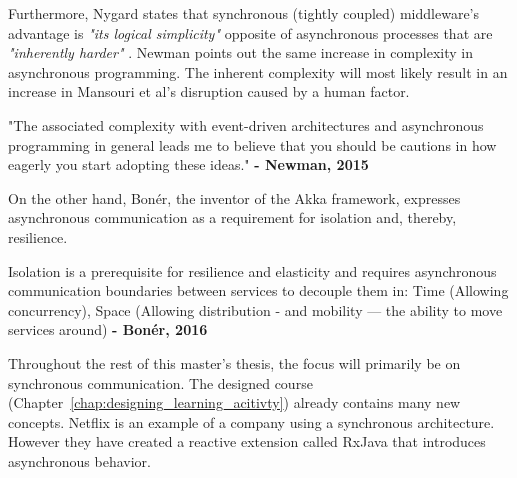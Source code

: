 \noindent Furthermore, Nygard states that synchronous (tightly coupled) middleware's advantage is \textit{"its logical simplicity"} opposite of asynchronous processes that are \textit{"inherently harder"} \cite[p. 115]{nygard2007release}. Newman points out the same increase in complexity in asynchronous programming. The inherent complexity will most likely result in an increase in Mansouri et al's \cite[p. 16]{omer2013resilience} disruption caused by a human factor.

\begin{citat} []
"The associated complexity with event-driven architectures and asynchronous programming in general leads me to believe that you should be cautions in how eagerly you start adopting these ideas." \textbf{- Newman, 2015} \cite[p. 57]{newman2015building}
\end{citat}

\noindent On the other hand, Bonér, the inventor of the Akka framework, expresses asynchronous communication as a requirement for isolation and, thereby, resilience.
\begin{citat} []
Isolation is a prerequisite for resilience and elasticity and requires asynchronous communication boundaries between services to decouple them in: Time (Allowing concurrency), Space (Allowing distribution - and mobility — the ability to move services around) \textbf{- Bonér, 2016} \cite[p. 7]{boner2016reactive}
\end{citat}

\noindent Throughout the rest of this master's thesis, the focus will primarily be on synchronous communication. The designed course (Chapter~\ref{chap:designing_learning_acitivty}) already contains many new concepts. Netflix is an example of a company using a synchronous architecture. However they have created a reactive extension called RxJava that introduces asynchronous behavior.